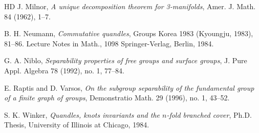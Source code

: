 \documentclass[12pt]{amsart}
\theoremstyle{definition}
\numberwithin{equation}{subsection}
\begin{document}
\begin{thebibliography}{HD}
 J. Milnor, \textit{A unique decomposition theorem for 3-manifolds}, Amer. J. Math. 84 (1962), 1--7.

 B. H. Neumann, \textit{Commutative quandles}, Groups Korea 1983 (Kyoungju, 1983), 81--86. Lecture Notes in Math., 1098 Springer-Verlag, Berlin, 1984.

 G. A. Niblo, \textit{Separability properties of free groups and surface groups}, J. Pure Appl. Algebra 78 (1992), no. 1, 77--84.

 E. Raptis and D. Varsos, \textit{On the subgroup separability of the fundamental group of a finite graph of groups}, Demonstratio Math. 29 (1996), no. 1, 43--52.

 S. K. Winker, \textit{Quandles, knots invariants and the $n$-fold branched cover}, Ph.D. Thesis, University of Illinois at Chicago, 1984.
\end{thebibliography}
\end{document}
